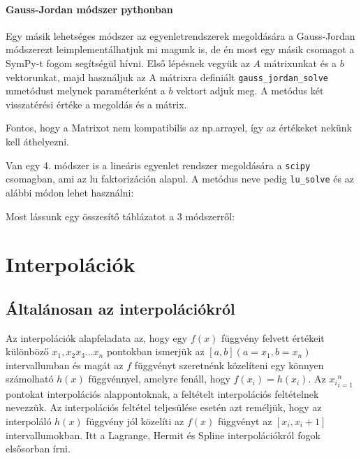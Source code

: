     \paragraph{Gauss-Jordan módszer
pythonban}\label{gauss-jordan-muxf3dszer-pythonban}

    Egy másik lehetséges módszer az egyenletrendszerek megoldására a
Gauss-Jordan módszerezt leimplementálhatjuk mi magunk is, de én most egy
másik csomagot a SymPy-t fogom segítségül hívni. Első lépésnek vegyük az
\(A\) mátrixunkat és a \(b\) vektorunkat, majd használjuk az A mátrixra
definiált \texttt{gauss\_jordan\_solve} mmetódust melynek paraméterként
a \(b\) vektort adjuk meg. A metódus két visszatérési értéke a megoldás
és a mátrix.

\begin{python}

\end{python}

    Fontos, hogy a Matrixot nem kompatibilis az np.arrayel, így az értékeket
nekünk kell áthelyezni.

    Van egy 4. módszer is a lineáris egyenlet rendszer megoldására a
\texttt{scipy} csomagban, ami az lu faktorizáción alapul. A metódus neve
pedig \texttt{lu\_solve} és az alábbi módon lehet használni:

\begin{python}

\end{python}

    Most lássunk egy összesítő táblázatot a 3 módszerről:

\begin{python}

\end{python}


 \section{Interpolációk}\label{interpoluxe1ciuxf3k}

    \subsection{Általánosan az
interpolációkról}\label{uxe1ltaluxe1nosan-az-interpoluxe1ciuxf3kruxf3l}

    Az interpolációk alapfeladata az, hogy egy \(f(x)\) függvény felvett
értékeit különböző \(x_1, x_2 x_3 \dots x_n\) pontokban ismerjük az
\([a,b](a=x_1, b=x_n)\) intervallumban és magát az \(f\) függvényt
szeretnénk közelíteni egy könnyen számolható \(h(x)\) függvénnyel,
amelyre fenáll, hogy \(f(x_i)=h(x_i)\). Az \({x_i}_{i=1}^n\) pontokat
interpolációs alappontoknak, a feltételt interpolációs feltételnek
nevezzük. Az interpolációs feltétel teljesülése esetén azt reméljük,
hogy az interpoláló \(h(x)\) függvény jól közelíti az \(f(x)\) függvényt
az \([x_i,x_i+1]\) intervallumokban. Itt a Lagrange, Hermit és Spline
interpolációkról fogok elsősorban írni.

